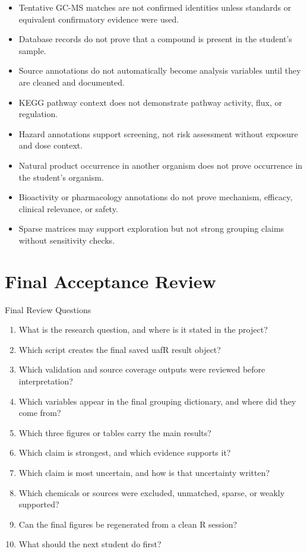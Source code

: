 \begin{itemize}
  \item Tentative GC-MS matches are not confirmed identities unless standards or equivalent confirmatory evidence were used.
  \item Database records do not prove that a compound is present in the student's sample.
  \item Source annotations do not automatically become analysis variables until they are cleaned and documented.
  \item KEGG pathway context does not demonstrate pathway activity, flux, or regulation.
  \item Hazard annotations support screening, not risk assessment without exposure and dose context.
  \item Natural product occurrence in another organism does not prove occurrence in the student's organism.
  \item Bioactivity or pharmacology annotations do not prove mechanism, efficacy, clinical relevance, or safety.
  \item Sparse matrices may support exploration but not strong grouping claims without sensitivity checks.
\end{itemize}

\section{Final Acceptance Review}
\begin{checklistbox}{Final Review Questions}
\begin{enumerate}
  \item What is the research question, and where is it stated in the project?
  \item Which script creates the final saved uafR result object?
  \item Which validation and source coverage outputs were reviewed before interpretation?
  \item Which variables appear in the final grouping dictionary, and where did they come from?
  \item Which three figures or tables carry the main results?
  \item Which claim is strongest, and which evidence supports it?
  \item Which claim is most uncertain, and how is that uncertainty written?
  \item Which chemicals or sources were excluded, unmatched, sparse, or weakly supported?
  \item Can the final figures be regenerated from a clean R session?
  \item What should the next student do first?
\end{enumerate}
\end{checklistbox}

